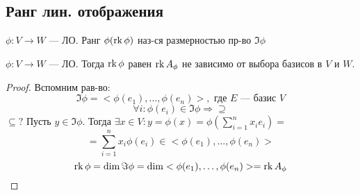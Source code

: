 \subsection{Ранг лин. отображения}
\begin{definition}
  $\phi \colon V \rightarrow W$ --- ЛО. Ранг $\phi (\operatorname{rk} \phi)$ наз-ся размерностью пр-во $\Im \phi$
\end{definition}
\begin{theorem}
\label{th:3_rank_lo}
$\phi: V \rightarrow W$ --- ЛО. Тогда $\operatorname{rk} \phi$ равен $\operatorname{rk} A_{\phi}$ не зависимо от выбора базисов в $V$ и $W$.
\end{theorem}
\begin{proof}
Вспомним рав-во:
\[
\Im \phi = <\phi(e_1), \ldots, \phi(e_n)>, \text{ где $E$ --- базис $V$}
\]
\[
\forall i \colon \phi(e_i) \in \Im \phi \Rightarrow \supseteq
\] 
$\subseteq ?$ Пусть $y \in \Im \phi$. Тогда $\exists x \in V \colon y = \phi(x) = \phi(\sum_{ i = 1}^{n} x_i e_i) = $
\[
= \sum_{ i = 1}^{n} x_i \phi(e_i) \in <\phi(e_1), \ldots, \phi(e_n)>
\]
\[
\operatorname{rk} \phi = \dim \Im \phi = \dim <\phi(e_1), \ldots, \phi(e_n)> = \operatorname{rk} A_\phi
\]
\end{proof}

